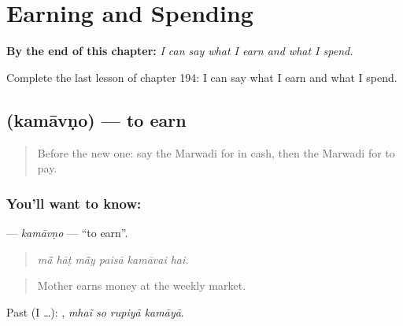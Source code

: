 
\chapter{Earning and Spending}
\label{ch:mw-earning-and-spending}

\begin{chapteropening}
\textbf{By the end of this chapter:} \emph{I can say what I earn and what I spend.}

Complete the last lesson of chapter 194: I can say what I earn and what I spend.
\end{chapteropening}

\section[\texorpdfstring{\mw{कमावणो} (kamāvṇo)}{कमावणो (kamāvṇo)}]{ (kamāvṇo) — to earn}

\label{lesson:MW-C194-kamavno}



\begin{quote}
Before the new one: say the Marwadi for in cash, then the Marwadi for to pay.
\end{quote}

\subsection*{You'll want to know: }
\textbf{} — \emph{kamāvṇo} — \textquotedblleft{}to earn\textquotedblright{}.

\begin{quote}
     
\end{quote}

\begin{quote}
\emph{mā̃ hāṭ mā̃y paisā kamāvai hai.}
\end{quote}

\begin{quote}
Mother earns money at the weekly market.
\end{quote}

Past (I …):    , \emph{mhaĩ so rupiyā kamāyā}.

